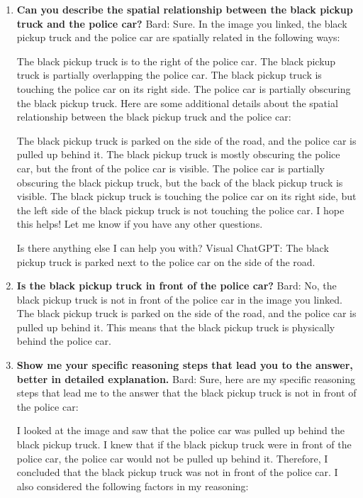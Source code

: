     \begin{enumerate}
        \item \textbf{Can you describe the spatial relationship between the  black pickup truck and the police car?}
        \subitem Bard: Sure. In the image you linked, the black pickup truck and the police car are spatially related in the following ways:

        The black pickup truck is to the right of the police car.
        The black pickup truck is partially overlapping the police car.
        The black pickup truck is touching the police car on its right side.
        The police car is partially obscuring the black pickup truck.
        Here are some additional details about the spatial relationship between the black pickup truck and the police car:
        
        The black pickup truck is parked on the side of the road, and the police car is pulled up behind it.
        The black pickup truck is mostly obscuring the police car, but the front of the police car is visible.
        The police car is partially obscuring the black pickup truck, but the back of the black pickup truck is visible.
        The black pickup truck is touching the police car on its right side, but the left side of the black pickup truck is not touching the police car.
        I hope this helps! Let me know if you have any other questions.
        
        Is there anything else I can help you with?
        \subitem Visual ChatGPT: The black pickup truck is parked next to the police car on the side of the road.
        \item \textbf{Is the black pickup truck in front of the police car?}
        \subitem Bard: No, the black pickup truck is not in front of the police car in the image you linked. The black pickup truck is parked on the side of the road, and the police car is pulled up behind it. This means that the black pickup truck is physically behind the police car.
        \item \textbf{Show me your specific reasoning steps that lead you to the answer, better in detailed explanation.}
        \subitem Bard: 
        Sure, here are my specific reasoning steps that lead me to the answer that the black pickup truck is not in front of the police car:
        
        I looked at the image and saw that the police car was pulled up behind the black pickup truck.
        I knew that if the black pickup truck were in front of the police car, the police car would not be pulled up behind it.
        Therefore, I concluded that the black pickup truck was not in front of the police car.
        I also considered the following factors in my reasoning:
        

\end{enumerate}
